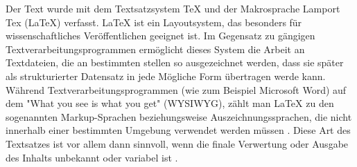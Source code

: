 Der Text wurde mit dem Textsatzsystem TeX und der Makrosprache Lamport Tex (LaTeX) verfasst. LaTeX ist ein Layoutsystem, das besonders für wissenschaftliches Veröffentlichen geeignet ist. Im Gegensatz zu gängigen Textverarbeitungsprogrammen ermöglicht dieses System die Arbeit an Textdateien, die an bestimmten stellen so ausgezeichnet werden, dass sie später als strukturierter Datensatz in jede Mögliche Form übertragen werde kann. Während Textverarbeitungsprogrammen (wie zum Beispiel Microsoft Word) auf dem "What you see is what you get" (WYSIWYG), zählt man LaTeX zu den sogenannten Markup-­Sprachen beziehungsweise Auszeichnungssprachen, die nicht innerhalb einer bestimmten Umgebung verwendet werden müssen \cite{Sievers_2012}. Diese Art des Textsatzes ist vor allem dann sinnvoll, wenn die finale Verwertung oder Ausgabe des Inhalts unbekannt oder variabel ist  \cite{braune_2007_latex}.


